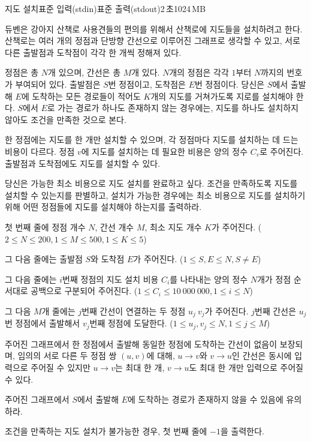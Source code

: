 \begin{problem}{지도 설치}{표준 입력(stdin)}{표준 출력(stdout)}{2\,초}{1024\,MB}

듀벤은 강아지 산책로 사용견들의 편의를 위해서 산책로에 지도들을 설치하려고 한다. 산책로는 여러 개의 정점과 단방향 간선으로 이루어진 그래프로 생각할 수 있고, 서로 다른 출발점과 도착점이 각각 한 개씩 정해져 있다.

정점은 총 $N$개 있으며, 간선은 총 $M$개 있다. $N$개의 정점은 각각 $1$부터 $N$까지의 번호가 부여되어 있다. 출발점은 $S$번 정점이고, 도착점은 $E$번 정점이다. 당신은 $S$에서 출발해 $E$에 도착하는 모든 경로들이 적어도 $K$개의 지도를 거쳐가도록 지로를 설치해야 한다. $S$에서 $E$로 가는 경로가 하나도 존재하지 않는 경우에는, 지도를 하나도 설치하지 않아도 조건을 만족한 것으로 본다.

한 정점에는 지도를 한 개만 설치할 수 있으며, 각 정점마다 지도를 설치하는 데 드는 비용이 다르다. 정점 $v$에 지도를 설치하는 데 필요한 비용은 양의 정수 $C_v$로 주어진다. 출발점과 도착점에도 지도를 설치할 수 있다.

당신은 가능한 최소 비용으로 지도 설치를 완료하고 싶다. 조건을 만족하도록 지도를 설치할 수 있는지를 판별하고, 설치가 가능한 경우에는 최소 비용으로 지도를 설치하기 위해 어떤 정점들에 지도를 설치해야 하는지를 출력하라.

\InputFile
첫 번째 줄에 정점 개수 $N$,  간선 개수 $M$, 최소 지도 개수 $K$가 주어진다. ($2 \leq N \leq 200, 1 \leq M \leq 500, 1 \leq K \leq 5$)

그 다음 줄에는 출발점 $S$와 도착점 $E$가 주어진다. ($1 \leq S,E \leq N, S \neq E$)

그 다음 줄에는 $i$번째 정점의 지도 설치 비용 $C_i$를 나타내는 양의 정수 $N$개가 정점 순서대로 공백으로 구분되어 주어진다. ($1 \leq C_i \leq 10\ 000\ 000, 1 \leq i \leq N$)

그 다음 $M$개 줄에는 $j$번째 간선이 연결하는 두 정점 $u_j\ v_j$가 주어진다. $j$번째 간선은 $u_j$번 정점에서 출발해서 $v_j$번째 정점에 도달한다. ($1 \leq u_j, v_j \leq N, 1 \leq j \leq M$)

주어진 그래프에서 한 정점에서 출발해 동일한 정점에 도착하는 간선이 없음이 보장되며, 임의의 서로 다른 두 정점 쌍 $(u, v)$에 대해, $u \rightarrow v$와 $v \rightarrow u$인 간선은 동시에 입력으로 주어질 수 있지만 $u \rightarrow v$는 최대 한 개, $v \rightarrow u$도 최대 한 개만 입력으로 주어질 수 있다.

주어진 그래프에서 $S$에서 출발해 $E$에 도착하는 경로가 존재하지 않을 수 있음에 유의하라.

\OutputFile
조건을 만족하는 지도 설치가 불가능한 경우, 첫 번째 줄에 $-1$을 출력한다.


\end{problem}
